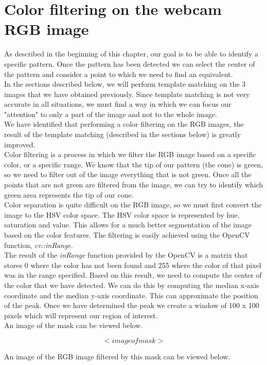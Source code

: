 \section{Color filtering on the webcam RGB image}
\noindent
As described in the beginning of this chapter, our goal is to be able to identify a specific pattern. Once the pattern has been detected we can select the center of the pattern and consider a point to which we need to find an equivalent. 
\\
In the sections described below, we will perform template matching on the 3 images that we have obtained previously. Since template matching is not very accurate in all situations, we must find a way in which we can focus our "attention" to only a part of the image and not to the whole image. 
\\
We have identified that performing a color filtering on the RGB images, the result of the template matching (described in the sections below) is greatly improved.
\\
Color filtering is a process in which we filter the RGB image based on a specific color, or a specific range. We know that the tip of our pattern (the cone) is green, so we need to filter out of the image everything that is not green. Once all the points that are not green are filtered from the image, we can try to identify which green area represents the tip of our cone. 
\\
Color separation is quite difficult on the RGB image, so we must first convert the image to the HSV color space. The HSV color space is represented by hue, saturation and value. This allows for a much better segmentation of the image based on the color features. The filtering is easily achieved using the OpenCV function, \emph{cv::inRange}. 
\\
The result of the \emph{inRange} function provided by the OpenCV is a matrix that stores 0 where the color has not been found and 255 where the color of that pixel was in the range specified. Based on this result, we need to compute the center of the color that we have detected. We can do this by computing the median x-axis coordinate and the median y-axis coordinate. This can approximate the position of the peak. Once we have determined the peak we create a window of 100 x 100 pixels which will represent our region of interest. 
\\
An image of the mask can be viewed below.

$$ <image of mask> $$

\noindent
An image of the RGB image filtered by this mask can be viewed below.

